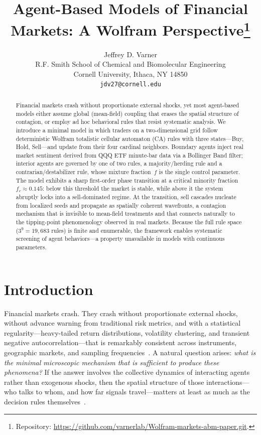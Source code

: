 \documentclass{article}
\title{Agent-Based Models of Financial Markets: A Wolfram Perspective\thanks{Repository: \url{https://github.com/varnerlab/Wolfram-markets-abm-paper.git}.}}
\author{%
  Jeffrey D. Varner \\
  R.F. Smith School of Chemical and Biomolecular Engineering\\
  Cornell University, Ithaca, NY 14850 \\
  \texttt{jdv27@cornell.edu} \\
}
\theoremstyle{definition}
\theoremstyle{remark}
\begin{document}
\maketitle

\begin{abstract}
Financial markets crash without proportionate external shocks, yet most agent-based models
either assume global (mean-field) coupling that erases the spatial structure of contagion,
or employ ad hoc behavioral rules that resist systematic analysis. We introduce a minimal
model in which traders on a two-dimensional grid follow deterministic Wolfram totalistic
cellular automaton (CA) rules with three states---Buy, Hold, Sell---and update from their
four cardinal neighbors. Boundary agents inject real market sentiment derived from QQQ ETF
minute-bar data via a Bollinger Band filter; interior agents are governed by one of two
rules, a majority/herding rule and a contrarian/destabilizer rule, whose mixture fraction~$f$
is the single control parameter. The model exhibits a sharp first-order phase transition at
a critical minority fraction $f_c \approx 0.145$: below this threshold the market is stable,
while above it the system abruptly locks into a sell-dominated regime. At the transition,
sell cascades nucleate from localized seeds and propagate as spatially coherent wavefronts,
a contagion mechanism that is invisible to mean-field treatments and that connects naturally
to the tipping-point phenomenology observed in real markets. Because the full rule space
($3^9 = 19{,}683$ rules) is finite and enumerable, the framework enables systematic
screening of agent behaviors---a property unavailable in models with continuous parameters.
\end{abstract}

\section{Introduction}

Financial markets crash. They crash without proportionate external shocks, without advance
warning from traditional risk metrics, and with a statistical regularity---heavy-tailed
return distributions, volatility clustering, and transient negative
autocorrelation---that is remarkably consistent across instruments, geographic markets,
and sampling frequencies~\cite{cont2001empirical,mandelbrot1963variation,sornette2017why}.
A natural question arises: \emph{what is the minimal microscopic mechanism that is sufficient
to produce these phenomena?} If the answer involves the collective dynamics of interacting
agents rather than exogenous shocks, then the spatial structure of those
interactions---who talks to whom, and how far signals travel---matters at least as much as
the decision rules themselves~\cite{battiston2016complexity}.
\end{document}
